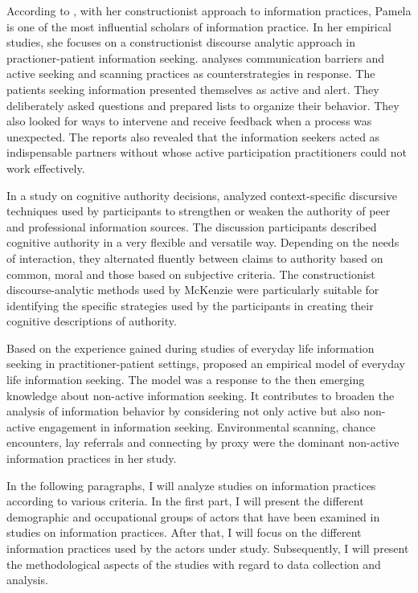 \documentclass[12pt, a4paper, titlepage, oneside, abstract=true, toc=listof, toc=bibliography, BCOR=1cm]{scrreprt}
\begin{document}
According to \citet[p. 121]{Savolainen2007}, with her constructionist approach to information practices, Pamela \citet{McKenzie2002, McKenzie2003, McKenzie2003a} is one of the most influential scholars of information practice. In her empirical studies, she focuses on a constructionist discourse analytic approach in practioner-patient information seeking. \citet{McKenzie2002} analyses communication barriers and active seeking and scanning practices as counterstrategies in response. The patients seeking information presented themselves as active and alert. They deliberately asked questions and prepared lists to organize their behavior. They also looked for ways to intervene and receive feedback when a process was unexpected. The reports also revealed that the information seekers acted as indispensable partners without whose active participation practitioners could not work effectively.

In a study on cognitive authority decisions, \citep{McKenzie2003} analyzed context-specific discursive techniques used by participants to strengthen or weaken the authority of peer and professional information sources. The discussion participants described cognitive authority in a very flexible and versatile way. Depending on the needs of interaction, they alternated fluently between claims to authority based on common, moral and those based on subjective criteria. The constructionist discourse-analytic methods used by McKenzie were particularly suitable for identifying the specific strategies used by the participants in creating their cognitive descriptions of authority. 

Based on the experience gained during studies of everyday life information seeking in practitioner-patient settings, \citet{McKenzie2003a} proposed an empirical model of everyday life information seeking. The model was a response to the then emerging knowledge about non-active information seeking. It contributes to broaden the analysis of information behavior by considering not only active but also non-active engagement in information seeking. Environmental scanning, chance encounters, lay referrals and connecting by proxy were the dominant non-active information practices in her study. 

In the following paragraphs, I will analyze studies on information practices according to various criteria. In the first part, I will present the different demographic and occupational groups of actors that have been examined in studies on information practices. After that, I will focus on the different information practices used by the actors under study. Subsequently, I will present the methodological aspects of the studies with regard to data collection and analysis. 
\end{document}

